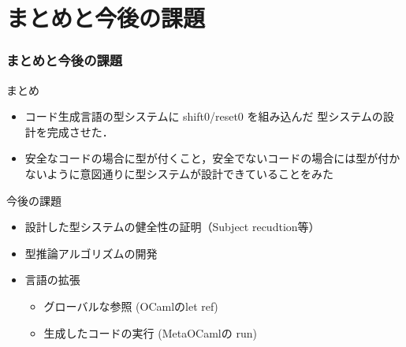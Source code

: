 
\section{まとめと今後の課題}

\begin{frame}
  \frametitle{まとめと今後の課題}
  まとめ
  \begin{itemize}
  \item コード生成言語の型システムに shift0/reset0 を組み込んだ 型システムの設計を完成させた．
  \item 安全なコードの場合に型が付くこと，安全でないコードの場合には型が付かないように意図通りに型システムが設計できていることをみた
  \end{itemize}

  \vspace{\baselineskip}

  今後の課題
  \begin{itemize}
  \item 設計した型システムの健全性の証明（Subject recudtion等）
  \item 型推論アルゴリズムの開発
  \item 言語の拡張
    \begin{itemize}
    \item グローバルな参照 (OCamlのlet ref)
    \item 生成したコードの実行 (MetaOCamlの run)
    \end{itemize}
  \end{itemize}
\end{frame}

